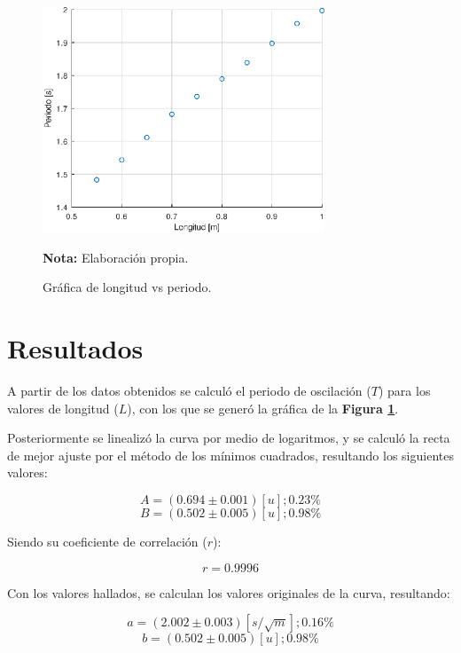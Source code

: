 \documentclass[letter,11pt]{article}
\newcommand{\source}[1]{\vspace{-11pt} \caption*{\small{\textbf{Nota:} {#1}}}}
\begin{document}
\begin{figure}
\centering
\includegraphics[width=0.75\textwidth]{resources/o1.1.eps}
\caption{Gráfica de longitud vs periodo.}
\label{figura3}
\source{Elaboración propia.}
\end{figure}

\section{Resultados}

A partir de los datos obtenidos se calculó el periodo de oscilación ($T$) para
los valores de longitud ($L$), con los que se generó la gráfica de la
\textbf{Figura \ref{figura3}}.

Posteriormente se linealizó la curva por medio de logaritmos, y se calculó la
recta de mejor ajuste por el método de los mínimos cuadrados, resultando los
siguientes valores:

\begin{equation*}
    A = (0.694 \pm 0.001) [u]; 0.23\%
\end{equation*}
\begin{equation*}
    B = (0.502 \pm 0.005) [u]; 0.98\%
\end{equation*}
\vspace{0.10cm}

Siendo su coeficiente de correlación ($r$):

\begin{equation*}
    r = 0.9996
\end{equation*}
\vspace{0.10cm}

Con los valores hallados, se calculan los valores originales de la curva,
resultando:

\begin{equation*}
    a = (2.002 \pm 0.003) [s/\sqrt{m}]; 0.16\%
\end{equation*}
\begin{equation*}
    b = (0.502 \pm 0.005) [u]; 0.98\%
\end{equation*}
\vspace{0.10cm}
\end{document}
